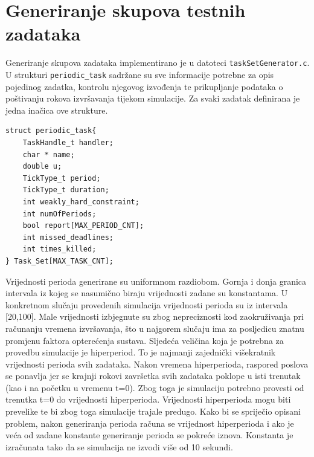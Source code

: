 \documentclass[../zavrsni.tex]{subfiles}
\begin{document}
\section{Generiranje skupova testnih zadataka}




Generiranje skupova zadataka implementirano je u datoteci \texttt{taskSetGenerator.c}. U strukturi \texttt{periodic\_task} sadržane su sve 
informacije potrebne za opis pojedinog zadatka, kontrolu njegovog izvođenja te prikupljanje podataka o poštivanju rokova 
izvršavanja tijekom simulacije. Za svaki zadatak definirana je jedna inačica ove strukture. 
\begin{lstlisting}[style=CStyle,caption={Struktura periodic\_task},captionpos=b]
struct periodic_task{
    TaskHandle_t handler;
    char * name;
    double u;
    TickType_t period;
    TickType_t duration;
    int weakly_hard_constraint;
    int numOfPeriods;
    bool report[MAX_PERIOD_CNT];
    int missed_deadlines;
    int times_killed;
} Task_Set[MAX_TASK_CNT];
\end{lstlisting}

Vrijednosti perioda generirane su uniformnom razdiobom. Gornja i donja granica intervala iz kojeg se nasumično biraju vrijednosti zadane su konstantama.
U konkretnom slučaju provedenih simulacija vrijednosti perioda su iz intervala [20,100]. Male vrijednosti izbjegnute su zbog nepreciznosti kod zaokruživanja pri
računanju vremena izvršavanja, što u najgorem slučaju ima za posljedicu znatnu promjenu faktora opterećenja sustava. 
Sljedeća veličina koja je potrebna za 
provedbu simulacije je hiperperiod. To je najmanji zajednički višekratnik vrijednosti perioda svih zadataka. Nakon vremena hiperperioda, raspored poslova 
se ponavlja jer se krajnji rokovi završetka svih zadataka poklope u isti trenutak (kao i na početku u vremenu t=0). Zbog toga je simulaciju potrebno provesti od trenutka t=0 do vrijednosti hiperperioda. 
Vrijednosti hiperperioda mogu biti prevelike te 
bi zbog toga simulacije trajale predugo. Kako bi se spriječio opisani problem, nakon generiranja perioda računa se vrijednost hiperperioda i ako je veća od zadane konstante
 generiranje perioda se pokreće iznova. Konstanta je izračunata tako da se simulacija ne izvodi više od 10 sekundi.
\end{document}

